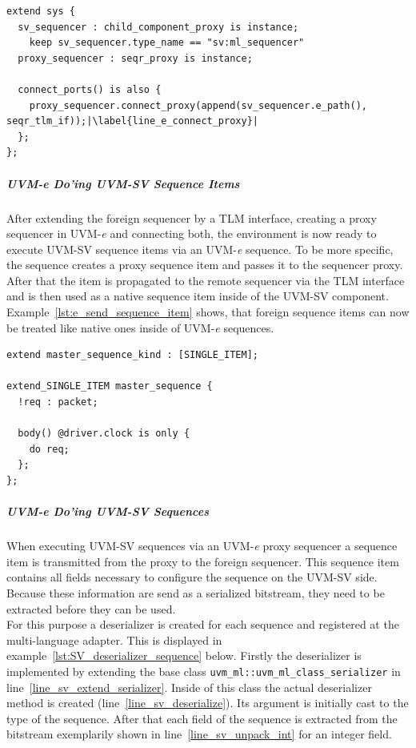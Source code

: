 \begin{lstlisting}[frame=htrbl, caption={\textit{e}: connecting the proxy sequencer and foreign sequencer},
label={lst:e_connect_proxy}]
extend sys {
  sv_sequencer : child_component_proxy is instance;
    keep sv_sequencer.type_name == "sv:ml_sequencer"
  proxy_sequencer : seqr_proxy is instance;
  
  connect_ports() is also {
    proxy_sequencer.connect_proxy(append(sv_sequencer.e_path(), seqr_tlm_if));|\label{line_e_connect_proxy}|
  }; 
};
\end{lstlisting}
\subparagraph{UVM-\textit{e} Do'ing UVM-SV Sequence Items}
After extending the foreign sequencer by a TLM interface, creating a proxy sequencer in UVM-\textit{e} and connecting both, the environment is now ready to execute UVM-SV sequence items via an UVM-\textit{e} sequence. To be more specific, the sequence creates a proxy sequence item and passes it to the sequencer proxy. After that the item is propagated to the remote sequencer via the TLM interface and is then used as a native sequence item inside of the UVM-SV component.\\
Example~\ref{lst:e_send_sequence_item} shows, that foreign sequence items can now be treated like native ones inside of UVM-\textit{e} sequences.
\lstset{language=e, numbers = left, escapechar=|, breaklines=true}
\begin{lstlisting}[frame=htrbl, caption={\textit{e}: sending an UVM-SV sequence item  from  an UVM-\textit{e} sequence},
label={lst:e_send_sequence_item}]
extend master_sequence_kind : [SINGLE_ITEM];

extend_SINGLE_ITEM master_sequence {
  !req : packet;
  
  body() @driver.clock is only {
    do req;
  };
};
\end{lstlisting}
\subparagraph{UVM-\textit{e} Do'ing UVM-SV Sequences}
When executing UVM-SV sequences via an UVM-\textit{e} proxy sequencer a sequence item is transmitted from the proxy to the foreign sequencer. This sequence item contains all fields necessary to configure the sequence on the UVM-SV side. Because these information are send as a serialized bitstream, they need to be extracted before they can be used.\\
For this purpose a deserializer is created for each sequence and registered at the multi-language adapter. This is displayed in example~\ref{lst:SV_deserializer_sequence} below. Firstly the deserializer is implemented by extending the base class \lstinline$uvm_ml::uvm_ml_class_serializer$ in line~\ref{line_sv_extend_serializer}. Inside of this class the actual deserializer method is created (line~\ref{line_sv_deserialize}). Its argument is initially cast to the type of the sequence. After that each field of the sequence is extracted from the bitstream exemplarily shown in line~\ref{line_sv_unpack_int} for an integer field.
